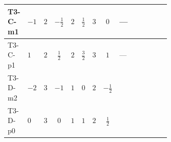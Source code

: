 \documentclass[8pt]{article}
\begin{document}
\begin{landscape}
\begin{longtable}{@{}llcccccc >{\raggedright\arraybackslash}p{0.21\linewidth} >{\raggedright\arraybackslash}p{0.21\linewidth} >{\raggedright\arraybackslash}p{0.21\linewidth}@{}}
\midrule
T3-C-m1 & $-1$ & $2$ & $-\frac{1}{2}$ & $2$ & $\frac{1}{2}$ & $3$ & $0$ & --- & \scriptsize\adjustbox{max width=\linewidth}{$\begin{gathered} +4 {\lambda_{12}^{(1)}} {\lambda_{HS_1}^{(1)}}\end{gathered}$} & \scriptsize\adjustbox{max width=\linewidth}{$\begin{gathered} +6 {\lambda_1} {\lambda_{HS_2}^{(1)}}\end{gathered}$} \\
\midrule
T3-C-p1 & $1$ & $2$ & $\frac{1}{2}$ & $2$ & $\frac{3}{2}$ & $3$ & $1$ & --- & \scriptsize\adjustbox{max width=\linewidth}{$\begin{gathered} +4 {\lambda_{12}^{(1)}} {\lambda_{HS_1}^{(1)}}\end{gathered}$} & \scriptsize\adjustbox{max width=\linewidth}{$\begin{gathered} +6 {\lambda_1} {\lambda_{HS_2}^{(1)}}\end{gathered}$} \\
\midrule
T3-D-m2 & $-2$ & $3$ & $-1$ & $1$ & $0$ & $2$ & $-\frac{1}{2}$ & \scriptsize\adjustbox{max width=\linewidth}{$\begin{gathered} -\frac{3 {g_1}^2 {\lambda_{HS_2}^{(1)}}}{2}\end{gathered}$} & \scriptsize\adjustbox{max width=\linewidth}{$\begin{gathered} +6 {\lambda_{12}^{(1)}} {\lambda_{HS_1}^{(1)}}\end{gathered}$} & \scriptsize\adjustbox{max width=\linewidth}{$\begin{gathered} +6 {\lambda_1} {\lambda_{HS_2}^{(1)}}\end{gathered}$} \\
\midrule
T3-D-p0 & $0$ & $3$ & $0$ & $1$ & $1$ & $2$ & $\frac{1}{2}$ & \scriptsize\adjustbox{max width=\linewidth}{$\begin{gathered} -\frac{15 {g_1}^2 {\lambda_{HS_2}^{(1)}}}{2}\end{gathered}$} & \scriptsize\adjustbox{max width=\linewidth}{$\begin{gathered} +6 {\lambda_{12}^{(1)}} {\lambda_{HS_1}^{(1)}}\end{gathered}$} & \scriptsize\adjustbox{max width=\linewidth}{$\begin{gathered} +6 {\lambda_1} {\lambda_{HS_2}^{(1)}}\end{gathered}$} \\
\midrule

\end{longtable}
\end{landscape}
\end{document}
